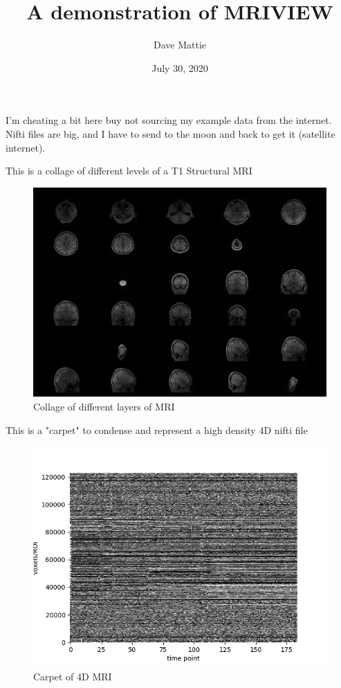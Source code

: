 \documentclass[]{report}
\begin{document}
\title{A demonstration of MRIVIEW}
\author{Dave Mattie}
\date{July 30, 2020}
\maketitle

I'm cheating a bit here buy not sourcing my example data from the internet.  Nifti files are big, and I have to send to the moon and back to get it (satellite internet).

This is a collage of different levels of a T1 Structural MRI

\begin{figure}[h!]
\centering
\includegraphics[scale=0.22]{collage.png}
\caption{Collage of different layers of MRI}
\label{fig:collage}
\end{figure}

This is a "carpet" to condense and represent a high density 4D nifti file

\begin{figure}[h!]
\centering
\includegraphics[scale=0.6]{carpet.png}
\caption{Carpet of 4D MRI}
\label{fig:carpet}
\end{figure}
\end{document}

